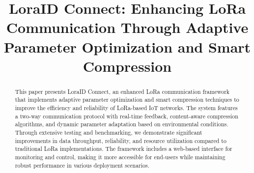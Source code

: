 \documentclass[conference]{IEEEtran}
\begin{document}
\title{LoraID Connect: Enhancing LoRa Communication Through Adaptive Parameter Optimization and Smart Compression}

\author{
    \and
    \and
}



\maketitle

\begin{abstract}
This paper presents LoraID Connect, an enhanced LoRa communication framework that implements adaptive parameter optimization and smart compression techniques to improve the efficiency and reliability of LoRa-based IoT networks. The system features a two-way communication protocol with real-time feedback, content-aware compression algorithms, and dynamic parameter adaptation based on environmental conditions. Through extensive testing and benchmarking, we demonstrate significant improvements in data throughput, reliability, and resource utilization compared to traditional LoRa implementations. The framework includes a web-based interface for monitoring and control, making it more accessible for end-users while maintaining robust performance in various deployment scenarios.
\end{abstract}
\end{document}

